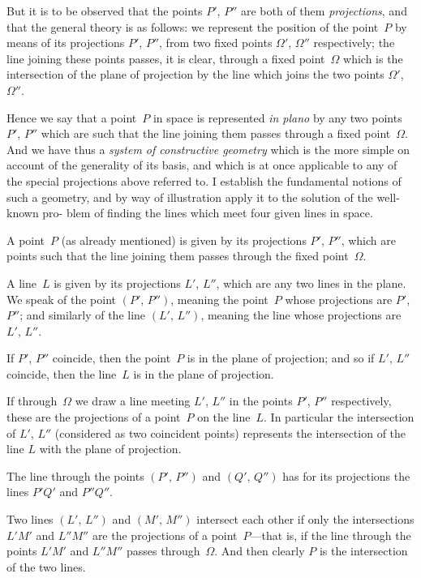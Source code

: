 \documentclass[11pt,a4paper]{article}
\theoremstyle{plain}
\theoremstyle{definition}
\begin{document}
But it is to be observed that the points $P'$, $P''$ are both of them \textit{projections},
and that the general theory is as follows: we represent the position of the point~$P$
by means of its projections $P'$, $P''$, from two fixed points $\Omega'$, $\Omega''$ respectively; the
line joining these points passes, it is clear, through a fixed point~$\Omega$ which is the
intersection of the plane of projection by the line which joins the two points $\Omega'$, $\Omega''$.

Hence we say that a point~$P$ in space is represented \textit{in plano} by any two points
$P'$, $P''$ which are such that the line joining them passes through a fixed point~$\Omega$.
And we have thus a \textit{system of constructive geometry} which is the more simple on
account of the generality of its basis, and which is at once applicable to any of the
special projections above referred to.  I establish the fundamental notions of such a
geometry, and by way of illustration apply it to the solution of the well-known pro-
blem of finding the lines which meet four given lines in space.

A point~$P$ (as already mentioned) is given by its projections $P'$, $P''$, which are
points such that the line joining them passes through the fixed point~$\Omega$.

A line~$L$ is given by its projections $L'$, $L''$, which are any two lines in the plane.
We speak of the point $(P',\,P'')$, meaning the point~$P$ whose projections are $P'$, $P''$;
and similarly of the line $(L',\,L'')$, meaning the line whose projections are $L'$, $L''$.

If $P'$, $P''$ coincide, then the point~$P$ is in the plane of projection; and so if
$L'$, $L''$ coincide, then the line~$L$ is in the plane of projection.

If through~$\Omega$ we draw a line meeting $L'$, $L''$ in the points $P'$, $P''$ respectively,
these are the projections of a point~$P$ on the line~$L$.  In particular the intersection
of $L'$, $L''$ (considered as two coincident points) represents the intersection of the line
$L$ with the plane of projection.

\clearpage

The line through the points $(P',\,P'')$ and $(Q',\,Q'')$ has for its projections the lines
$P'Q'$ and $P''Q''$.

Two lines $(L',\,L'')$ and $(M',\,M'')$ intersect each other if only the intersections $L'M'$
and $L''M''$ are the projections of a point~$P$---that is, if the line through the points
$L'M'$ and $L''M''$ passes through~$\Omega$.  And then clearly $P$ is the intersection of the two
lines.
\end{document}
